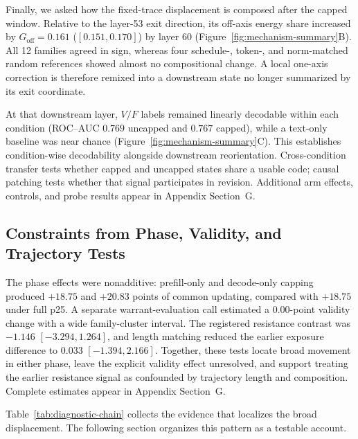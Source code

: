\documentclass[letterpaper]{article} %
\begin{document}
Finally, we asked how the fixed-trace displacement is composed after the capped window. Relative to the layer-53 exit direction, its off-axis energy share increased by $G_{\mathrm{off}}=0.161$ ($[0.151,0.170]$) by layer 60 (Figure~\ref{fig:mechanism-summary}B). All 12 families agreed in sign, whereas four schedule-, token-, and norm-matched random references showed almost no compositional change. A local one-axis correction is therefore remixed into a downstream state no longer summarized by its exit coordinate.

At that downstream layer, $V/F$ labels remained linearly decodable within each condition (ROC--AUC $0.769$ uncapped and $0.767$ capped), while a text-only baseline was near chance (Figure~\ref{fig:mechanism-summary}C). This establishes condition-wise decodability alongside downstream reorientation. Cross-condition transfer tests whether capped and uncapped states share a usable code; causal patching tests whether that signal participates in revision. Additional arm effects, controls, and probe results appear in Appendix Section~G.

\subsection{Constraints from Phase, Validity, and Trajectory Tests}

The phase effects were nonadditive: prefill-only and decode-only capping produced $+18.75$ and $+20.83$ points of common updating, compared with $+18.75$ under full p25. A separate warrant-evaluation call estimated a $0.00$-point validity change with a wide family-cluster interval. The registered resistance contrast was $-1.146$ $[-3.294,1.264]$, and length matching reduced the earlier exposure difference to $0.033$ $[-1.394,2.166]$. Together, these tests locate broad movement in either phase, leave the explicit validity effect unresolved, and support treating the earlier resistance signal as confounded by trajectory length and composition. Complete estimates appear in Appendix Section~G.

Table~\ref{tab:diagnostic-chain} collects the evidence that localizes the broad displacement. The following section organizes this pattern as a testable account.
\end{document}
